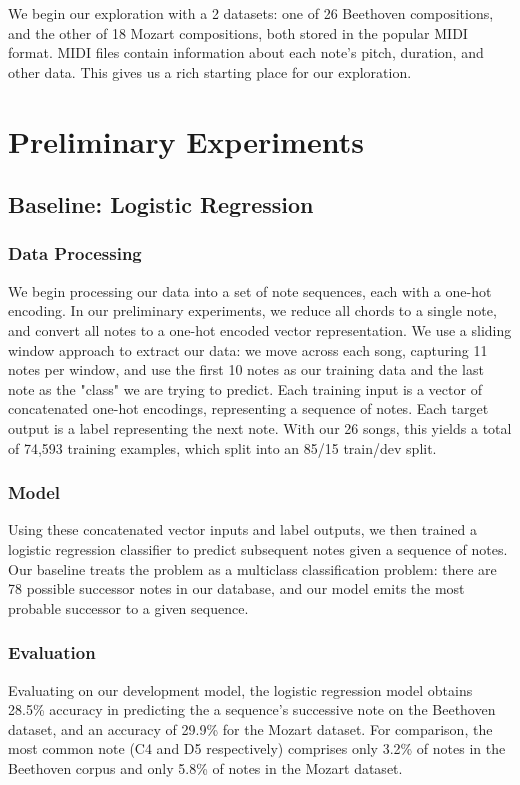 \documentclass[twoside,twocolumn]{article}
\begin{document}
We begin our exploration with a 2 datasets: one of 26 Beethoven compositions, and the other of 18 Mozart compositions, both stored in the popular MIDI format. MIDI files contain information about each note's pitch, duration, and other data. This gives us a rich starting place for our exploration.




\section{Preliminary Experiments}

\subsection{Baseline: Logistic Regression}

\subsubsection{Data Processing}
We begin processing our data into a set of note sequences, each with a one-hot encoding. In our preliminary experiments, we reduce all chords to a single note, and convert all notes to a one-hot encoded vector representation. We use a sliding window approach to extract our data: we move across each song, capturing 11 notes per window, and use the first 10 notes as our training data and the last note as the "class" we are trying to predict. Each training input is a vector of concatenated one-hot encodings, representing a sequence of notes. Each target output is a label representing the next note. With our 26 songs, this yields a total of 74,593 training examples, which split into an 85/15 train/dev split.

\subsubsection{Model}
Using these concatenated vector inputs and label outputs, we then trained a logistic regression classifier to predict subsequent notes given a sequence of notes. Our baseline treats the problem as a multiclass classification problem: there are 78 possible successor notes in our database, and our model emits the most probable successor to a given sequence.

\subsubsection{Evaluation}
Evaluating on our development model, the logistic regression model obtains 28.5\% accuracy in predicting the a sequence's successive note on the Beethoven dataset, and an accuracy of 29.9\% for the Mozart dataset. For comparison, the most common note (C4 and D5 respectively) comprises only 3.2\% of notes in the Beethoven corpus and only 5.8\% of notes in the Mozart dataset.
\end{document}
